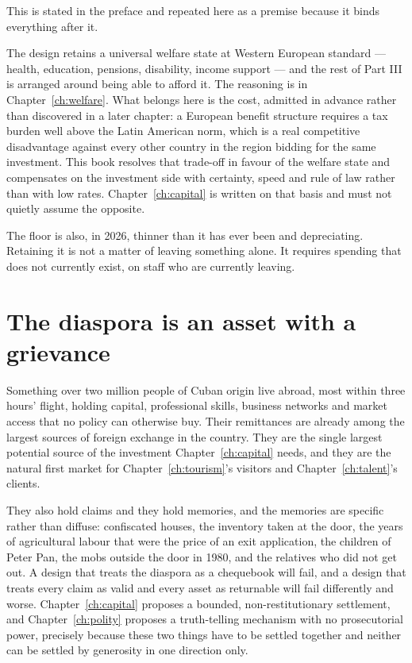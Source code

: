 This is stated in the preface and repeated here as a premise because it binds
everything after it.

The design retains a universal welfare state at Western European standard ---
health, education, pensions, disability, income support --- and the rest of Part
III is arranged around being able to afford it. The reasoning is in
Chapter~\ref{ch:welfare}. What belongs here is the cost, admitted in advance
rather than discovered in a later chapter: a European benefit structure requires
a tax burden well above the Latin American norm, which is a real competitive
disadvantage against every other country in the region bidding for the same
investment. This book resolves that trade-off in favour of the welfare state and
compensates on the investment side with certainty, speed and rule of law rather
than with low rates. Chapter~\ref{ch:capital} is written on that basis and must
not quietly assume the opposite.

The floor is also, in 2026, thinner than it has ever been and depreciating.
Retaining it is not a matter of leaving something alone. It requires spending
that does not currently exist, on staff who are currently leaving.

\section{The diaspora is an asset with a grievance}

Something over two million people of Cuban origin live abroad, most within
three hours' flight, holding capital, professional skills, business networks
and market access that no policy can otherwise buy. Their remittances are
already among the largest sources of foreign exchange in the country. They are
the single largest potential source of the investment Chapter~\ref{ch:capital}
needs, and they are the natural first market for
Chapter~\ref{ch:tourism}'s visitors and Chapter~\ref{ch:talent}'s clients.

They also hold claims and they hold memories, and the memories are specific
rather than diffuse: confiscated houses, the inventory taken at the door, the
years of agricultural labour that were the price of an exit application, the
children of Peter Pan, the mobs outside the door in 1980, and the relatives who
did not get out. A design that treats the diaspora as a chequebook will fail,
and a design that treats every claim as valid and every asset as returnable will
fail differently and worse. Chapter~\ref{ch:capital} proposes a bounded,
non-restitutionary settlement, and Chapter~\ref{ch:polity} proposes a
truth-telling mechanism with no prosecutorial power, precisely because these two
things have to be settled together and neither can be settled by generosity in
one direction only.


